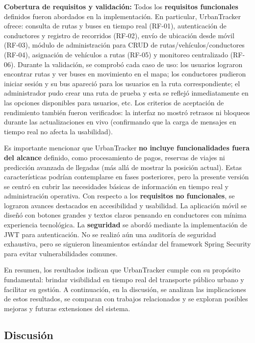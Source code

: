 \documentclass[
]{article}
\begin{document}
\textbf{Cobertura de requisitos y validación:} Todos los
\textbf{requisitos funcionales} definidos fueron abordados en la
implementación. En particular, UrbanTracker ofrece: consulta de rutas y
buses en tiempo real (RF-01), autenticación de conductores y registro de
recorridos (RF-02), envío de ubicación desde móvil (RF-03), módulo de
administración para CRUD de rutas/vehículos/conductores (RF-04),
asignación de vehículos a rutas (RF-05) y monitoreo centralizado
(RF-06). Durante la validación, se comprobó cada caso de uso: los
usuarios lograron encontrar rutas y ver buses en movimiento en el mapa;
los conductores pudieron iniciar sesión y su bus apareció para los
usuarios en la ruta correspondiente; el administrador pudo crear una
ruta de prueba y esta se reflejó inmediatamente en las opciones
disponibles para usuarios, etc. Los criterios de aceptación de
rendimiento también fueron verificados: la interfaz no mostró retrasos
ni bloqueos durante las actualizaciones en vivo (confirmando que la
carga de mensajes en tiempo real no afecta la usabilidad).

Es importante mencionar que UrbanTracker \textbf{no incluye
funcionalidades fuera del alcance} definido, como procesamiento de
pagos, reservas de viajes ni predicción avanzada de llegadas (más allá
de mostrar la posición actual). Estas características podrían
contemplarse en fases posteriores, pero la presente versión se centró en
cubrir las necesidades básicas de información en tiempo real y
administración operativa. Con respecto a los \textbf{requisitos no
funcionales}, se lograron avances destacados en accesibilidad y
usabilidad. La aplicación móvil se diseñó con botones grandes y textos
claros pensando en conductores con mínima experiencia tecnológica. La
\textbf{seguridad} se abordó mediante la implementación de JWT para
autenticación. No se realizó aún una auditoría de seguridad exhaustiva,
pero se siguieron lineamientos estándar del framework Spring Security
para evitar vulnerabilidades comunes.

En resumen, los resultados indican que UrbanTracker cumple con su
propósito fundamental: brindar visibilidad en tiempo real del transporte
público urbano y facilitar su gestión. A continuación, en la discusión,
se analizan las implicaciones de estos resultados, se comparan con
trabajos relacionados y se exploran posibles mejoras y futuras
extensiones del sistema.

\subsection{Discusión}\label{discusiuxf3n}
\end{document}
